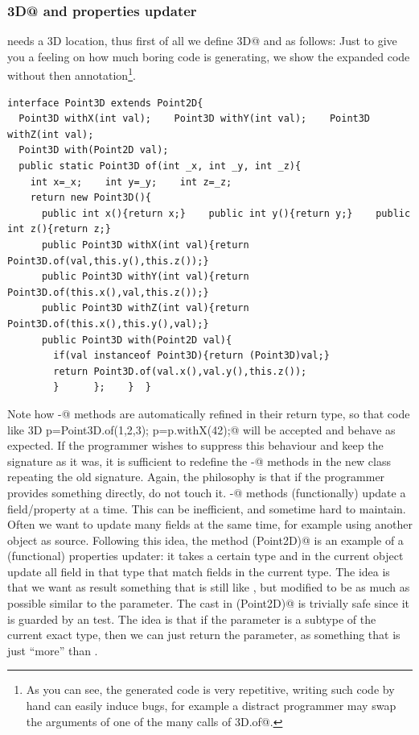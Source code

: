 \subsubsection*{\Q@Point3D@ and properties updater}
\Q@Bird@ needs a 3D location, thus first of all we define \Q@Point3D@ and
as follows:
Just to give you a feeling on how much boring code \mixin is generating,  we show the expanded code without then \mixin annotation\footnote{
As you can see, the generated code is very repetitive, writing such code by hand can easily induce bugs, for example a distract programmer may
swap the arguments of one of the many calls of \Q@Point3D.of@.
}.\begin{lstlisting}
interface Point3D extends Point2D{
  Point3D withX(int val);    Point3D withY(int val);    Point3D withZ(int val);
  Point3D with(Point2D val);
  public static Point3D of(int _x, int _y, int _z){
    int x=_x;    int y=_y;    int z=_z;
    return new Point3D(){
      public int x(){return x;}    public int y(){return y;}    public int z(){return z;}
      public Point3D withX(int val){return Point3D.of(val,this.y(),this.z());}
      public Point3D withY(int val){return Point3D.of(this.x(),val,this.z());}
      public Point3D withZ(int val){return Point3D.of(this.x(),this.y(),val);}
      public Point3D with(Point2D val){
        if(val instanceof Point3D){return (Point3D)val;}
        return Point3D.of(val.x(),val.y(),this.z());
        }      };    }  }
\end{lstlisting}
Note how \Q@with-@ methods are automatically refined in their return type, so that code like 
\Q@Point3D p=Point3D.of(1,2,3); p=p.withX(42);@ will be accepted and behave as expected. If the programmer wishes to suppress this behaviour and keep the signature as it was, it is sufficient to redefine the \Q@with-@ methods in the new class repeating the old signature.
Again, the philosophy is that if the programmer provides something directly, \mixin do not touch it.
\Q@with-@ methods (functionally) update a field/property at a time.
This can be inefficient, and sometime hard to maintain.
Often we want to update many fields at the same time, for example using another object as source.
Following this idea, the method \Q@with(Point2D)@ is an example of a (functional) properties updater: 
it takes a certain type and in the current object update all field in that type that match fields in the current type.
The idea is that we want as result something that is still like \Q@this@, but modified to be as much as possible similar to the parameter.
The cast in \Q@with(Point2D)@ is trivially safe since it is guarded by an \Q@instanceof@ test. The idea is that if the parameter is a subtype of the current exact type, then we can just return the parameter, as something that is just ``more'' than \Q@this@.

